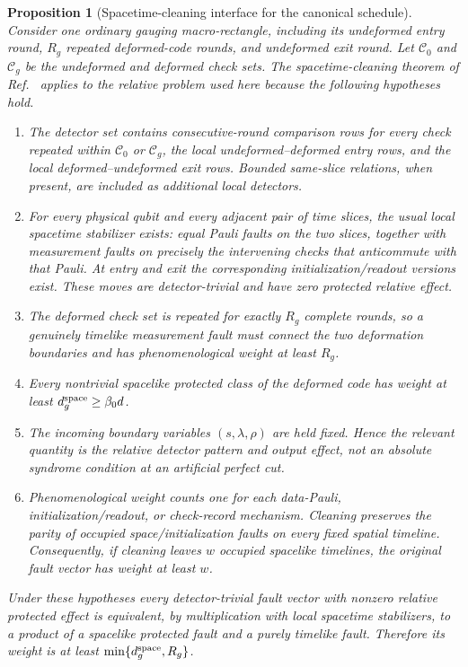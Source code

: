 \documentclass[aps,prx,reprint,superscriptaddress,nofootinbib,floatfix,longbibliography]{revtex4-2}
\newtheorem{proposition}[theorem]{Proposition}
\theoremstyle{definition}
\begin{document}
\begin{proposition}[Spacetime-cleaning interface for the canonical schedule]
\label{prop:cleaning-interface}
Consider one ordinary gauging macro-rectangle, including its undeformed entry
round, $R_g$ repeated deformed-code rounds, and undeformed exit round.  Let
$\mathcal C_0$ and $\mathcal C_g$ be the undeformed and deformed check sets.
The spacetime-cleaning theorem of Ref.~\cite{WilliamsonYoderGauging} applies
to the relative problem used here because the following hypotheses hold.
\begin{enumerate}
\item[\textup{(WY1)}] The detector set contains consecutive-round comparison rows for every
check repeated within $\mathcal C_0$ or $\mathcal C_g$, the local
undeformed--deformed entry rows, and the local deformed--undeformed exit rows.
Bounded same-slice relations, when present, are included as additional local
detectors.
\item[\textup{(WY2)}] For every physical qubit and every adjacent pair of time slices, the
usual local spacetime stabilizer exists: equal Pauli faults on the two slices,
together with measurement faults on precisely the intervening checks that
anticommute with that Pauli.  At entry and exit the corresponding
initialization/readout versions exist.  These moves are detector-trivial and
have zero protected relative effect.
\item[\textup{(WY3)}] The deformed check set is repeated for exactly $R_g$ complete rounds, so
a genuinely timelike measurement fault must connect the two deformation
boundaries and has phenomenological weight at least $R_g$.
\item[\textup{(WY4)}] Every nontrivial spacelike protected class of the deformed code has
weight at least $d_g^{\rm space}\geq\beta_0d$.
\item[\textup{(WY5)}] The incoming boundary variables $(s,\lambda,\rho)$ are held fixed.
Hence the relevant quantity is the relative detector pattern and output
effect, not an absolute syndrome condition at an artificial perfect cut.
\item[\textup{(WY6)}] Phenomenological weight counts one for each data-Pauli,
initialization/readout, or check-record mechanism.  Cleaning preserves the
parity of occupied space/initialization faults on every fixed spatial
timeline.  Consequently, if cleaning leaves $w$ occupied spacelike timelines,
the original fault vector has weight at least $w$.
\end{enumerate}
Under these hypotheses every detector-trivial fault vector with nonzero
relative protected effect is equivalent, by multiplication with local
spacetime stabilizers, to a product of a spacelike protected fault and a
purely timelike fault.  Therefore its weight is at least
$\min\{d_g^{\rm space},R_g\}$.
\end{proposition}
\end{document}
